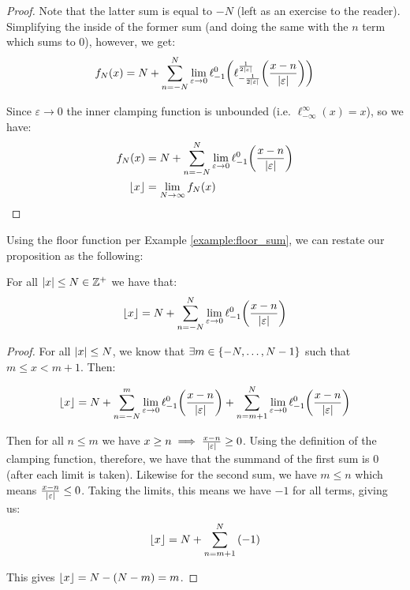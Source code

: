 \begin{example}
\begin{proof}
        Note that the latter sum is equal to $-N$ (left as an exercise to the reader). Simplifying the inside of the former sum (and doing the same with the $n$ term which sums to $0$), however, we get:
        $$
            f_N(x) = N+\sum_{n=-N}^{N}{\lim_{\varepsilon\to0}{\ell_{-1}^{0}\paren*{\ell_{-\frac{1}{2\abs{\varepsilon}}}^{\frac{1}{2\abs{\varepsilon}}}\paren*{\frac{x-n}{\abs{\varepsilon}}}}}}
        $$

        Since $\varepsilon\to 0$ the inner clamping function is unbounded (i.e. $\ell_{-\infty}^{\infty}(x)=x$), so we have:
        \begin{align*}
            f_N(x) &= N+\sum_{n=-N}^{N}{\lim_{\varepsilon\to0}{\ell_{-1}^{0}\paren*{\frac{x-n}{\abs{\varepsilon}}}}}\\
            \floor{x} &= \lim_{N\to\infty}{f_N(x)}
        \end{align*}
    \end{proof}
\end{example}

\begin{theorem}
    Using the floor function per Example \ref{example:floor_sum}, we can restate our proposition as the following:

    For all $\abs{x}\leq N\in\mathbb{Z}^+$ we have that:
    $$
        \floor{x} = N+\sum_{n=-N}^{N}{\lim_{\varepsilon\to0}{\ell_{-1}^{0}\paren*{\frac{x-n}{\abs{\varepsilon}}}}}
    $$

    \begin{proof}
        For all $\abs{x}\leq N$, we know that $\exists m\in\{-N,\dots,N-1\}$ such that $m\leq x< m+1$. Then:

        $$
            \floor{x} = N+\sum_{n=-N}^{m}{\lim_{\varepsilon\to0}{\ell_{-1}^{0}\paren*{\frac{x-n}{\abs{\varepsilon}}}}}+\sum_{n=m+1}^{N}{\lim_{\varepsilon\to0}{\ell_{-1}^{0}\paren*{\frac{x-n}{\abs{\varepsilon}}}}}
        $$

        Then for all $n\leq m$ we have $x\geq n\implies\frac{x-n}{\abs{\varepsilon}}\geq 0$. Using the definition of the clamping function, therefore, we have that the summand of the first sum is 0 (after each limit is taken). Likewise for the second sum, we have $m\leq n$ which means $\frac{x-n}{\abs{\varepsilon}}\leq 0$. Taking the limits, this means we have $-1$ for all terms, giving us:
        $$
            \lfloor x\rfloor = N+\sum_{n=m+1}^{N}{(-1)}
        $$

        This gives $\lfloor x\rfloor=N-(N-m)=m$.
    \end{proof}
\end{theorem}

